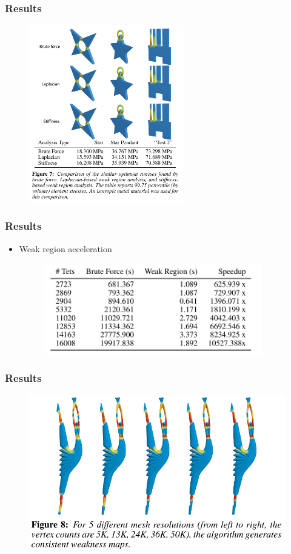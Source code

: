 \documentclass[serif,mathserif, 12pt]{beamer}
\begin{document}
\begin{frame}
  \frametitle{Results}
  \begin{figure}
    \centering
    \includegraphics[width=0.6\textwidth]{img/comp_diff_methods}
  \end{figure}
\end{frame}

\begin{frame}
  \frametitle{Results}
  \begin{itemize}
  \item Weak region acceleration
    \begin{figure}
      \centering
      \includegraphics[width=0.9\textwidth]{img/timings}
    \end{figure}
  \end{itemize}
\end{frame}

\begin{frame}
  \frametitle{Results}
  \begin{figure}
    \centering
    \includegraphics[width=\textwidth]{img/resolution}
  \end{figure}
\end{frame}
\end{document}
